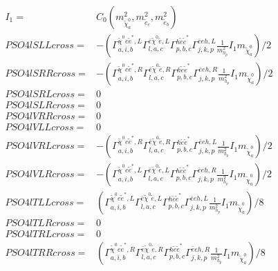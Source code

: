 \documentclass[A4,landscape]{article}
\begin{document}
\begin{align} 
I_1= & C_0(m^2_{\tilde{\chi}^0_{{a}}}, m^2_{\tilde{e}_{{c}}}, m^2_{\tilde{e}_{{b}}}) \\ 
  PSO4lSLLcross= & -( \Gamma^{\tilde{\chi}^0 e \tilde{e}^*,L}_{a, i, b} \Gamma^{\bar{e}\tilde{\chi}^0 \tilde{e} ,L}_{l, a, c} \Gamma^{h \tilde{e} \tilde{e}^*}_{p, b, c} \Gamma^{\bar{e}e h ,L}_{j, k, p} \frac{1}{m^2_{h_{{p}}}} I_1 m_{\tilde{\chi}^0_{{a}}})/2 \\ 
  PSO4lSRRcross= & -( \Gamma^{\tilde{\chi}^0 e \tilde{e}^*,R}_{a, i, b} \Gamma^{\bar{e}\tilde{\chi}^0 \tilde{e} ,R}_{l, a, c} \Gamma^{h \tilde{e} \tilde{e}^*}_{p, b, c} \Gamma^{\bar{e}e h ,R}_{j, k, p} \frac{1}{m^2_{h_{{p}}}} I_1 m_{\tilde{\chi}^0_{{a}}})/2 \\ 
  PSO4lSRLcross= & 0 \\ 
  PSO4lSLRcross= & 0 \\ 
  PSO4lVRRcross= & 0 \\ 
  PSO4lVLLcross= & 0 \\ 
  PSO4lVRLcross= & -( \Gamma^{\tilde{\chi}^0 e \tilde{e}^*,R}_{a, i, b} \Gamma^{\bar{e}\tilde{\chi}^0 \tilde{e} ,R}_{l, a, c} \Gamma^{h \tilde{e} \tilde{e}^*}_{p, b, c} \Gamma^{\bar{e}e h ,L}_{j, k, p} \frac{1}{m^2_{h_{{p}}}} I_1 m_{\tilde{\chi}^0_{{a}}})/2 \\ 
  PSO4lVLRcross= & -( \Gamma^{\tilde{\chi}^0 e \tilde{e}^*,L}_{a, i, b} \Gamma^{\bar{e}\tilde{\chi}^0 \tilde{e} ,L}_{l, a, c} \Gamma^{h \tilde{e} \tilde{e}^*}_{p, b, c} \Gamma^{\bar{e}e h ,R}_{j, k, p} \frac{1}{m^2_{h_{{p}}}} I_1 m_{\tilde{\chi}^0_{{a}}})/2 \\ 
  PSO4lTLLcross= & ( \Gamma^{\tilde{\chi}^0 e \tilde{e}^*,L}_{a, i, b} \Gamma^{\bar{e}\tilde{\chi}^0 \tilde{e} ,L}_{l, a, c} \Gamma^{h \tilde{e} \tilde{e}^*}_{p, b, c} \Gamma^{\bar{e}e h ,L}_{j, k, p} \frac{1}{m^2_{h_{{p}}}} I_1 m_{\tilde{\chi}^0_{{a}}})/8 \\ 
  PSO4lTLRcross= & 0 \\ 
  PSO4lTRLcross= & 0 \\ 
  PSO4lTRRcross= & ( \Gamma^{\tilde{\chi}^0 e \tilde{e}^*,R}_{a, i, b} \Gamma^{\bar{e}\tilde{\chi}^0 \tilde{e} ,R}_{l, a, c} \Gamma^{h \tilde{e} \tilde{e}^*}_{p, b, c} \Gamma^{\bar{e}e h ,R}_{j, k, p} \frac{1}{m^2_{h_{{p}}}} I_1 m_{\tilde{\chi}^0_{{a}}})/8 \\ 
\end{align} 
\end{document}
